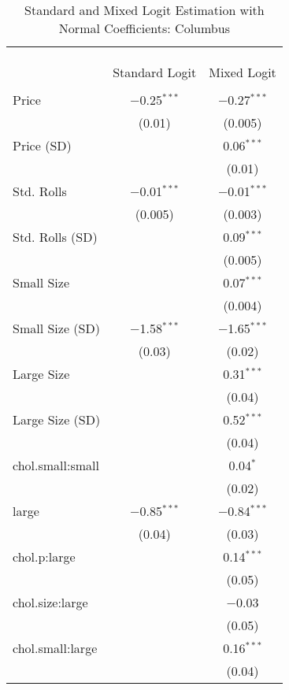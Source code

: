 
\begin{table}[!htbp] \centering 
  \caption{Standard and Mixed Logit Estimation with Normal Coefficients: Columbus} 
  \label{tab:mnlColumbusBaseline} 
\begin{tabular}{@{\extracolsep{5pt}}lcc} 
\\[-1.8ex]\hline 
\hline \\[-1.8ex] 
\\[-1.8ex] & \multicolumn{2}{c}{} \\ 
 & Standard Logit & Mixed Logit \\ 
\hline \\[-1.8ex] 
 Price & $-$0.25$^{***}$ & $-$0.27$^{***}$ \\ 
  & (0.01) & (0.005) \\ 
  Price (SD) &  & 0.06$^{***}$ \\ 
  &  & (0.01) \\ 
  Std. Rolls & $-$0.01$^{***}$ & $-$0.01$^{***}$ \\ 
  & (0.005) & (0.003) \\ 
  Std. Rolls (SD) &  & 0.09$^{***}$ \\ 
  &  & (0.005) \\ 
  Small Size &  & 0.07$^{***}$ \\ 
  &  & (0.004) \\ 
  Small Size (SD) & $-$1.58$^{***}$ & $-$1.65$^{***}$ \\ 
  & (0.03) & (0.02) \\ 
  Large Size &  & 0.31$^{***}$ \\ 
  &  & (0.04) \\ 
  Large Size (SD) &  & 0.52$^{***}$ \\ 
  &  & (0.04) \\ 
  chol.small:small &  & 0.04$^{*}$ \\ 
  &  & (0.02) \\ 
  large & $-$0.85$^{***}$ & $-$0.84$^{***}$ \\ 
  & (0.04) & (0.03) \\ 
  chol.p:large &  & 0.14$^{***}$ \\ 
  &  & (0.05) \\ 
  chol.size:large &  & $-$0.03 \\ 
  &  & (0.05) \\ 
  chol.small:large &  & 0.16$^{***}$ \\ 
  &  & (0.04) \\ 

\end{tabular}
\end{table}
